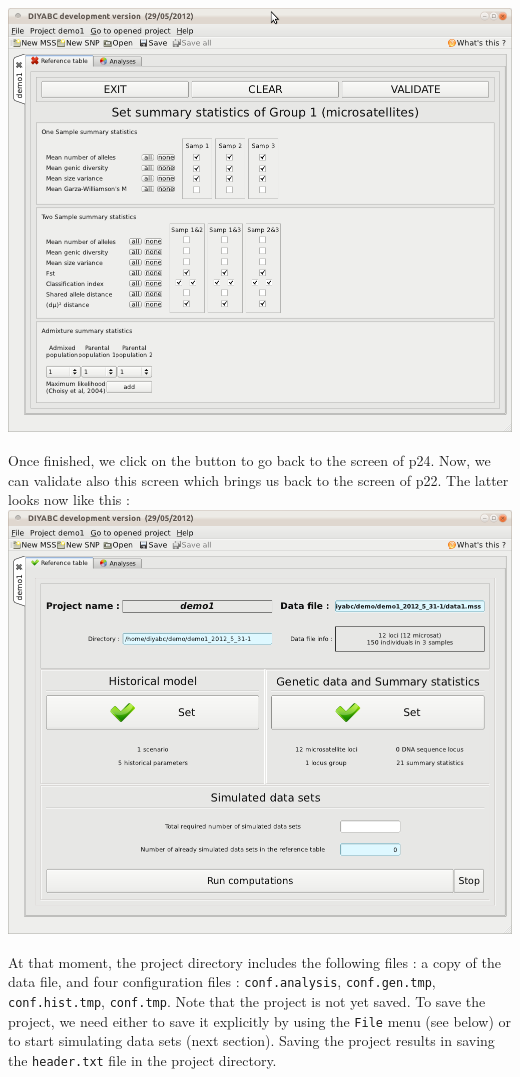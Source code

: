 \includegraphics[scale=0.35]{gui_pictures/Capture-DIYABC-21.png} 

Once finished, we click on the  button to go back to the screen of p24. Now, we can validate also this screen which brings us back to the screen of p22. The latter looks now like this : \\

\includegraphics[scale=0.35]{gui_pictures/Capture-DIYABC-22.png} 

At that moment, the project directory includes the following files : a copy of the data file, and four configuration files : \texttt{conf.analysis}, \texttt{conf.gen.tmp}, \texttt{conf.hist.tmp}, \texttt{conf.tmp}. Note that the project is not yet saved. To save the project, we need either to save it explicitly by using the \texttt{File} menu (see below) or to start simulating data sets (next section). Saving the project results in saving the \texttt{header.txt} file in the project directory.


